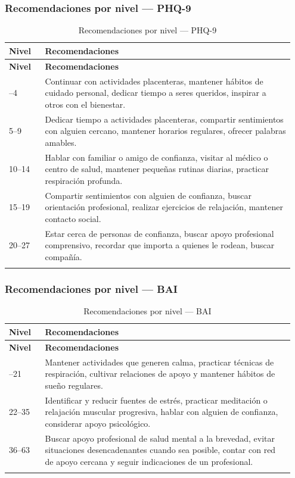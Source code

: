 \subsubsection{Recomendaciones por nivel --- PHQ-9}

\begin{longtable}{p{0.12\linewidth} p{0.83\linewidth}}
\toprule
\rowcolor{tableheader!20}
\textbf{Nivel} & \textbf{Recomendaciones} \\
\midrule
\endfirsthead
\rowcolor{tableheader!20}
\textbf{Nivel} & \textbf{Recomendaciones} \\
\midrule
\endhead
\bottomrule
\endfoot
0--4   & Continuar con actividades placenteras, mantener hábitos de cuidado personal, dedicar tiempo a seres queridos, inspirar a otros con el bienestar. \\
5--9   & Dedicar tiempo a actividades placenteras, compartir sentimientos con alguien cercano, mantener horarios regulares, ofrecer palabras amables. \\
10--14 & Hablar con familiar o amigo de confianza, visitar al médico o centro de salud, mantener pequeñas rutinas diarias, practicar respiración profunda. \\
15--19 & Compartir sentimientos con alguien de confianza, buscar orientación profesional, realizar ejercicios de relajación, mantener contacto social. \\
20--27 & Estar cerca de personas de confianza, buscar apoyo profesional comprensivo, recordar que importa a quienes le rodean, buscar compañía. \\
\bottomrule
\caption{Recomendaciones por nivel --- PHQ-9}
\label{tab:phq9_recomendaciones}
\end{longtable}

\subsubsection{Recomendaciones por nivel --- BAI}

\begin{longtable}{p{0.12\linewidth} p{0.83\linewidth}}
\toprule
\rowcolor{tableheader!20}
\textbf{Nivel} & \textbf{Recomendaciones} \\
\midrule
\endfirsthead
\rowcolor{tableheader!20}
\textbf{Nivel} & \textbf{Recomendaciones} \\
\midrule
\endhead
\bottomrule
\endfoot
0--21  & Mantener actividades que generen calma, practicar técnicas de respiración, cultivar relaciones de apoyo y mantener hábitos de sueño regulares. \\
22--35 & Identificar y reducir fuentes de estrés, practicar meditación o relajación muscular progresiva, hablar con alguien de confianza, considerar apoyo psicológico. \\
36--63 & Buscar apoyo profesional de salud mental a la brevedad, evitar situaciones desencadenantes cuando sea posible, contar con red de apoyo cercana y seguir indicaciones de un profesional. \\
\bottomrule
\caption{Recomendaciones por nivel --- BAI}
\label{tab:bai_recomendaciones}
\end{longtable}


